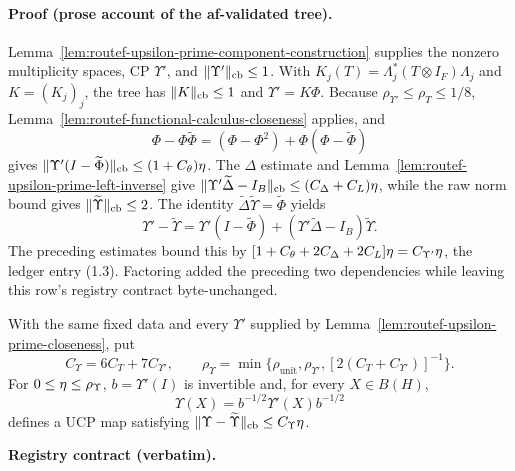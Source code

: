 \paragraph{Proof (prose account of the af-validated tree).}
Lemma~\ref{lem:routef-upsilon-prime-component-construction} supplies the nonzero multiplicity
spaces, CP $\Upsilon'$, and $\lVert \Upsilon'\rVert_{\mathrm{cb}}\le1$.  With
$K_j(T)=\Lambda_j^*(T\otimes I_F)\Lambda_j$ and $K=(K_j)_j$, the tree has
$\lVert K\rVert_{\mathrm{cb}}\le1$ and $\Upsilon'=K\Phi$.  Because
$\rho_{\Upsilon'}\le\rho_T\le1/8$, Lemma~\ref{lem:routef-functional-calculus-closeness}
applies, and
\[
 \Phi-\Phi\widetilde\Phi=(\Phi-\Phi^2)+\Phi(\Phi-\widetilde\Phi)
\]
gives $\lVert \Upsilon'(I-\widetilde\Phi)\rVert_{\mathrm{cb}}\le(1+C_\theta)\eta$.
The $\Delta$ estimate and Lemma~\ref{lem:routef-upsilon-prime-left-inverse} give
$\lVert \Upsilon'\widetilde\Delta-I_B\rVert_{\mathrm{cb}}\le(C_\Delta+C_L)\eta$,
while the raw norm bound gives $\lVert \widetilde\Upsilon\rVert_{\mathrm{cb}}\le2$.
The identity $\widetilde\Delta\widetilde\Upsilon=\widetilde\Phi$ yields
\[
 \Upsilon'-\widetilde\Upsilon
 =\Upsilon'(I-\widetilde\Phi)
 +(\Upsilon'\widetilde\Delta-I_B)\widetilde\Upsilon.
\]
The preceding estimates bound this by $[1+C_\theta+2C_\Delta+2C_L]\eta
=C_{\Upsilon'}\eta$, the ledger entry (1.3).  Factoring added the preceding two
dependencies while leaving this row's registry contract byte-unchanged.

\begin{lemma}\label{lem:routef-upsilon-normalization-closeness}
With the same fixed data and every $\Upsilon'$ supplied by
Lemma~\ref{lem:routef-upsilon-prime-closeness}, put
\[
 C_\Upsilon=6C_T+7C_{\Upsilon'},\qquad
 \rho_\Upsilon=\min\{\rho_{\mathrm{unit}},\rho_{\Upsilon'},
 [2(C_T+C_{\Upsilon'})]^{-1}\}.
\]
For $0\le\eta\le\rho_\Upsilon$, $b=\Upsilon'(I)$ is invertible and, for every
$X\in B(H)$,
\[
 \Upsilon(X)=b^{-1/2}\Upsilon'(X)b^{-1/2}
\]
defines a UCP map satisfying
$\lVert \Upsilon-\widetilde\Upsilon\rVert_{\mathrm{cb}}\le C_\Upsilon\eta$.
\end{lemma}

\noindent\textbf{Registry contract (verbatim).}

